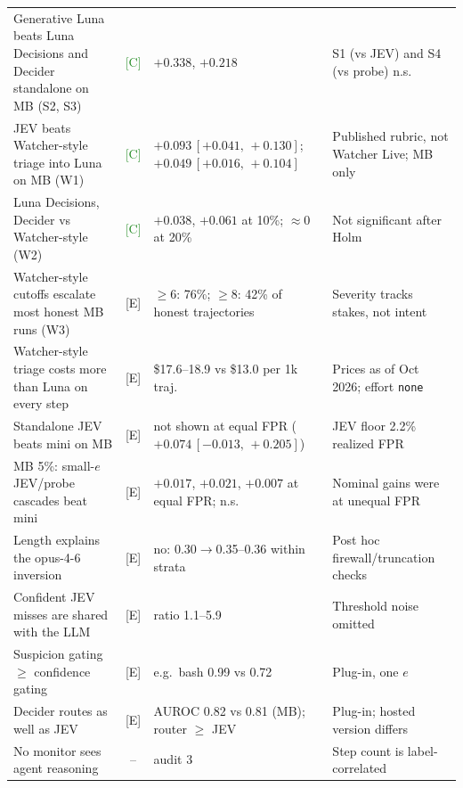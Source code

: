 \documentclass[11pt]{article}
\newcommand{\tC}{\textsf{\scriptsize\textcolor{ForestGreen}{[C]}}\xspace}
\newcommand{\tE}{\textsf{\scriptsize\textcolor{ink2}{[E]}}\xspace}
\newcommand{\ci}[2]{\,[#1,\,#2]}
\begin{document}
{\begin{xltabular}{\linewidth}{@{}>{\raggedright\arraybackslash}p{4.6cm}c>{\raggedright\arraybackslash}p{3.6cm}>{\raggedright\arraybackslash}X@{}}
Generative Luna beats Luna Decisions and Decider standalone on MB (S2, S3) & \tC & $+0.338$, $+0.218$ & S1 (vs JEV) and S4 (vs probe) n.s.\\
JEV beats Watcher-style triage into Luna on MB (W1) & \tC & $+0.093\ci{+0.041}{+0.130}$; $+0.049\ci{+0.016}{+0.104}$ & Published rubric, not Watcher Live; MB only\\
Luna Decisions, Decider vs Watcher-style (W2) & \tC & $+0.038$, $+0.061$ at 10\%; $\approx0$ at 20\% & Not significant after Holm\\
Watcher-style cutoffs escalate most honest MB runs (W3) & \tE & $\ge6$: 76\%; $\ge8$: 42\% of honest trajectories & Severity tracks stakes, not intent\\
Watcher-style triage costs more than Luna on every step & \tE & \$17.6--18.9 vs \$13.0 per 1k traj. & Prices as of Oct 2026; effort \texttt{none}\\
Standalone JEV beats mini on MB & \tE & not shown at equal FPR ($+0.074\ci{-0.013}{+0.205}$) & JEV floor 2.2\% realized FPR\\
MB 5\%: small-$e$ JEV/probe cascades beat mini & \tE & $+0.017$, $+0.021$, $+0.007$ at equal FPR; n.s. & Nominal gains were at unequal FPR\\
Length explains the opus-4-6 inversion & \tE & no: 0.30$\to$0.35--0.36 within strata & Post hoc firewall/truncation checks\\
Confident JEV misses are shared with the LLM & \tE & ratio 1.1--5.9 & Threshold noise omitted\\
Suspicion gating $\ge$ confidence gating & \tE & e.g.\ bash 0.99 vs 0.72 & Plug-in, one $e$\\
Decider routes as well as JEV & \tE & AUROC 0.82 vs 0.81 (MB); router $\ge$ JEV & Plug-in; hosted version differs\\
No monitor sees agent reasoning & -- & audit 3 & Step count is label-correlated\\
\bottomrule
\end{xltabular}}
\end{document}

